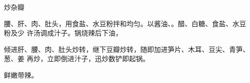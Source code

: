 \begin{recipe}{炒杂瓣}

\ingredients


\preparation

腰、肝、肉、肚头，用食盐、水豆粉拌和均匀。以酱油、。醋、白糖、食盐、水豆粉及少
许汤调成汁子。锅烧辣后下油，

倾进肝、腰、肉、肚头炒转，继下豆瓣炒转，随即加进笋片、木耳、豆尖、青笋、葱、姜
再炒，立即倒进汁子，迅炒数铲即起锅。

\features

鲜嫩带辣。

\end{recipe}

